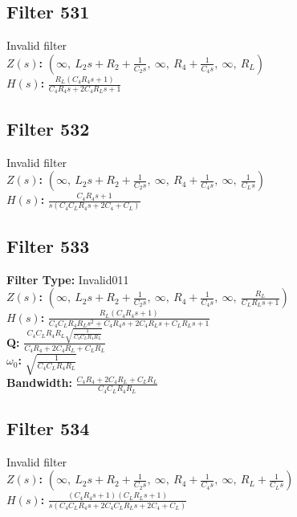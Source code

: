 \documentclass{article}
\begin{document}
\subsection*{Filter 531}
Invalid filter \\ 
\textbf{$Z(s)$:} $\left( \infty, \  L_{2} s + R_{2} + \frac{1}{C_{2} s}, \  \infty, \  R_{4} + \frac{1}{C_{4} s}, \  \infty, \  R_{L}\right)$ \\ 
\textbf{$H(s)$:} $\frac{R_{L} \left(C_{4} R_{4} s + 1\right)}{C_{4} R_{4} s + 2 C_{4} R_{L} s + 1}$ \\ 
\subsection*{Filter 532}
Invalid filter \\ 
\textbf{$Z(s)$:} $\left( \infty, \  L_{2} s + R_{2} + \frac{1}{C_{2} s}, \  \infty, \  R_{4} + \frac{1}{C_{4} s}, \  \infty, \  \frac{1}{C_{L} s}\right)$ \\ 
\textbf{$H(s)$:} $\frac{C_{4} R_{4} s + 1}{s \left(C_{4} C_{L} R_{4} s + 2 C_{4} + C_{L}\right)}$ \\ 
\subsection*{Filter 533}
\textbf{Filter Type:} Invalid011 \\ 
\textbf{$Z(s)$:} $\left( \infty, \  L_{2} s + R_{2} + \frac{1}{C_{2} s}, \  \infty, \  R_{4} + \frac{1}{C_{4} s}, \  \infty, \  \frac{R_{L}}{C_{L} R_{L} s + 1}\right)$ \\ 
\textbf{$H(s)$:} $\frac{R_{L} \left(C_{4} R_{4} s + 1\right)}{C_{4} C_{L} R_{4} R_{L} s^{2} + C_{4} R_{4} s + 2 C_{4} R_{L} s + C_{L} R_{L} s + 1}$ \\ 
\textbf{Q:} $\frac{C_{4} C_{L} R_{4} R_{L} \sqrt{\frac{1}{C_{4} C_{L} R_{4} R_{L}}}}{C_{4} R_{4} + 2 C_{4} R_{L} + C_{L} R_{L}}$ \\ 
\textbf{$\omega_0$:} $\sqrt{\frac{1}{C_{4} C_{L} R_{4} R_{L}}}$ \\ 
\textbf{Bandwidth:} $\frac{C_{4} R_{4} + 2 C_{4} R_{L} + C_{L} R_{L}}{C_{4} C_{L} R_{4} R_{L}}$ \\ 
\subsection*{Filter 534}
Invalid filter \\ 
\textbf{$Z(s)$:} $\left( \infty, \  L_{2} s + R_{2} + \frac{1}{C_{2} s}, \  \infty, \  R_{4} + \frac{1}{C_{4} s}, \  \infty, \  R_{L} + \frac{1}{C_{L} s}\right)$ \\ 
\textbf{$H(s)$:} $\frac{\left(C_{4} R_{4} s + 1\right) \left(C_{L} R_{L} s + 1\right)}{s \left(C_{4} C_{L} R_{4} s + 2 C_{4} C_{L} R_{L} s + 2 C_{4} + C_{L}\right)}$ \\ 
\end{document}
